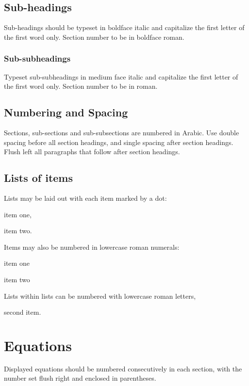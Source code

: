 \documentclass[twoside]{article}
\begin{document}
\subsection{Sub-headings}
\noindent
Sub-headings should be typeset in boldface italic and capitalize
the first letter of the first word only. Section number to be in
boldface roman.

\subsubsection{Sub-subheadings}
\noindent
Typeset sub-subheadings in medium face italic and capitalize the
first letter of the first word only. Section number to be in
roman.

\subsection{Numbering and Spacing}
\noindent
Sections, sub-sections and sub-subsections are numbered in
Arabic.  Use double spacing before all section headings, and
single spacing after section headings. Flush left all paragraphs
that follow after section headings.

\subsection{Lists of items}
\noindent
Lists may be laid out with each item marked by a dot:
\begin{itemlist}
 \item item one,
 \item item two.
\end{itemlist}
Items may also be numbered in lowercase roman numerals:
\begin{romanlist}
 \item item one
 \item item two
          \begin{alphlist}
          \item Lists within lists can be numbered with lowercase
              roman letters,
          \item second item.
          \end{alphlist}
\end{romanlist}

\section{Equations}
\noindent
Displayed equations should be numbered consecutively in each
section, with the number set flush right and enclosed in
parentheses.
\end{document}
